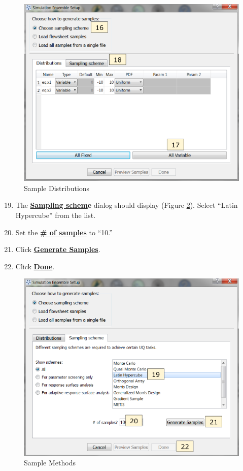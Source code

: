 \begin{figure}[H]
	\begin{center}
		\includegraphics[scale=0.55]{Chapt_surrogates/figs/uqSample1}
		\caption{Sample Distributions}
		\label{fig.tut.sur.new.uq.sample1}
	\end{center}
\end{figure}
\begin{enumerate}
	\setcounter{enumi}{18}
	\item The \textbf{\underline{Sampling schem}e} dialog should display (Figure \ref{fig.tut.sur.new.uq.sample2}). Select ``Latin Hypercube'' from the list.
	\item Set the \textbf{\underline{\# of samples}} to ``10.''
	\item Click \textbf{\underline{Generate Samples}}.
	\item Click \textbf{\underline{Done}}.
\end{enumerate}
\begin{figure}[H]
	\begin{center}
		\includegraphics[scale=0.55]{Chapt_surrogates/figs/uqSample2}
		\caption{Sample Methods}
		\label{fig.tut.sur.new.uq.sample2}
	\end{center}
\end{figure}
